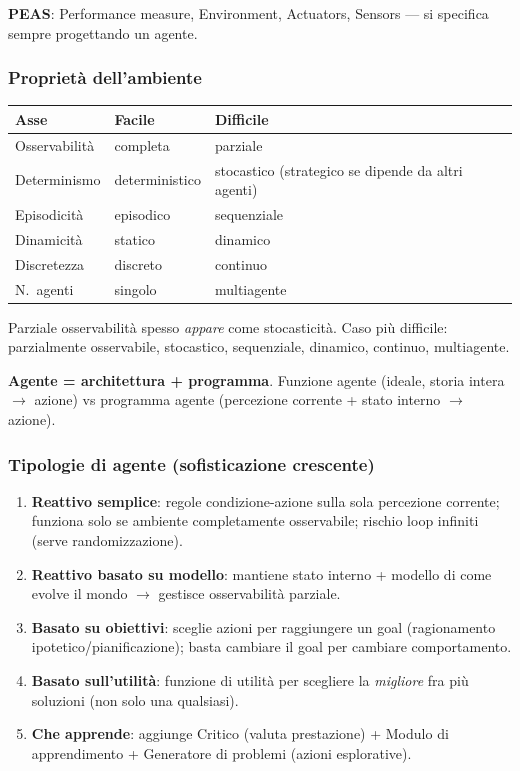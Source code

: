 \documentclass[10pt,a4paper]{article}
\begin{document}
\textbf{PEAS}: Performance measure, Environment, Actuators, Sensors --- si specifica sempre progettando un agente.

\subsubsection*{Proprietà dell'ambiente}

\begin{center}
\begin{tabular}{@{}lll@{}}
\toprule
\textbf{Asse} & \textbf{Facile} & \textbf{Difficile} \\
\midrule
Osservabilità & completa & parziale \\
Determinismo & deterministico & stocastico (strategico se dipende da altri agenti) \\
Episodicità & episodico & sequenziale \\
Dinamicità & statico & dinamico \\
Discretezza & discreto & continuo \\
N.\ agenti & singolo & multiagente \\
\bottomrule
\end{tabular}
\end{center}

Parziale osservabilità spesso \emph{appare} come stocasticità. Caso più difficile: parzialmente osservabile, stocastico, sequenziale, dinamico, continuo, multiagente.

\textbf{Agente = architettura + programma}. Funzione agente (ideale, storia intera $\to$ azione) vs programma agente (percezione corrente + stato interno $\to$ azione).

\subsubsection*{Tipologie di agente (sofisticazione crescente)}

\begin{enumerate}
  \item \textbf{Reattivo semplice}: regole condizione-azione sulla sola percezione corrente; funziona solo se ambiente completamente osservabile; rischio loop infiniti (serve randomizzazione).
  \item \textbf{Reattivo basato su modello}: mantiene stato interno + modello di come evolve il mondo $\to$ gestisce osservabilità parziale.
  \item \textbf{Basato su obiettivi}: sceglie azioni per raggiungere un goal (ragionamento ipotetico/pianificazione); basta cambiare il goal per cambiare comportamento.
  \item \textbf{Basato sull'utilità}: funzione di utilità per scegliere la \emph{migliore} fra più soluzioni (non solo una qualsiasi).
  \item \textbf{Che apprende}: aggiunge Critico (valuta prestazione) + Modulo di apprendimento + Generatore di problemi (azioni esplorative).
\end{enumerate}
\end{document}
